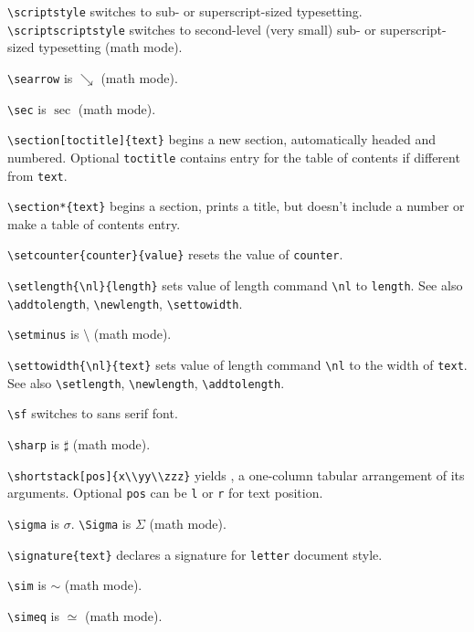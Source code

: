 \verb"\scriptstyle" switches to sub- or superscript-sized typesetting.
	\verb"\scriptscriptstyle" switches to second-level (very small)
	sub- or superscript-sized typesetting (math mode).

\verb"\searrow" is $\searrow$ (math mode).

\verb"\sec" is $\sec$ (math mode).

\verb"\section[toctitle]{text}" begins a new section, automatically headed and
	numbered.  Optional \verb"toctitle" contains entry for the
	table of contents if different from \verb"text".

\verb"\section*{text}" begins a section, prints a title, but doesn't include
	a number or make a table of contents entry.

\verb"\setcounter{counter}{value}" resets the value of \verb"counter".

\verb"\setlength{\nl}{length}" sets value of length command \verb"\nl"
	to \verb"length".  See also \verb"\addtolength", \verb"\newlength",
	\verb"\settowidth".

\verb"\setminus" is $\setminus$ (math mode).

\verb"\settowidth{\nl}{text}" sets value of length command \verb"\nl" to the
	width of \verb"text". See also \verb"\setlength", \verb"\newlength",
	\verb"\addtolength".

\verb"\sf" switches to {\sf sans serif} font.

\verb"\sharp" is $\sharp$ (math mode).

\verb"\shortstack[pos]{x\\yy\\zzz}" yields ,
	a one-column tabular arrangement of its arguments.  Optional
	\verb"pos" can be \verb"l" or \verb"r" for text position.

\verb"\sigma" is $\sigma$. \verb"\Sigma" is $\Sigma$ (math mode).

\verb"\signature{text}" declares a signature for \verb"letter" document style.

\verb"\sim" is $\sim$ (math mode).

\verb"\simeq" is $\simeq$ (math mode).

